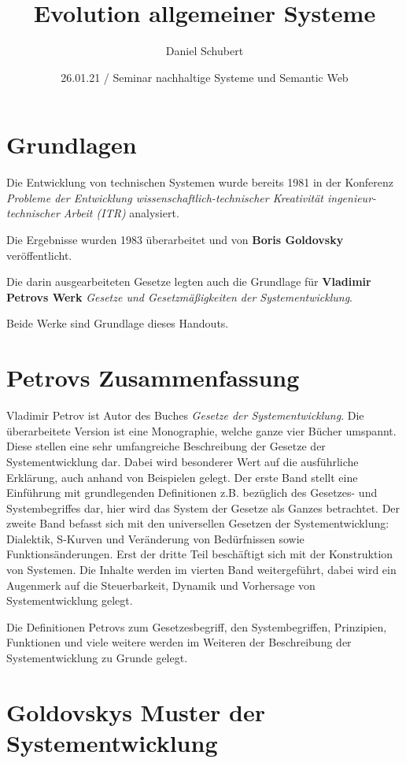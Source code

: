 \documentclass[a4paper,11pt]{article}
\title{Evolution allgemeiner Systeme}
\author{Daniel Schubert}
\date{26.01.21 / Seminar nachhaltige Systeme und Semantic Web}
\begin{document}
\maketitle

\section{Grundlagen}
Die Entwicklung von technischen Systemen wurde bereits 1981 in der Konferenz
\emph{Probleme der Entwicklung wissenschaftlich-technischer Kreativität
  ingenieur-technischer Arbeit (ITR)} analysiert.

Die Ergebnisse wurden 1983 überarbeitet und von \textbf{Boris Goldovsky}
veröffentlicht. 

Die darin ausgearbeiteten Gesetze legten auch die Grundlage für
\textbf{Vladimir Petrovs Werk} \emph{Gesetze und Gesetzmäßigkeiten der
  Systementwicklung}.

Beide Werke sind Grundlage dieses Handouts.

\section{Petrovs Zusammenfassung}

Vladimir Petrov ist Autor des Buches \cite{Petrov2020} \emph{Gesetze der
  Systementwicklung}. Die überarbeitete Version ist eine Monographie, welche
ganze vier Bücher umspannt. Diese stellen eine sehr umfangreiche Beschreibung
der Gesetze der Systementwicklung dar. Dabei wird besonderer Wert auf die
ausführliche Erklärung, auch anhand von Beispielen gelegt. Der erste Band
stellt eine Einführung mit grundlegenden Definitionen z.B. bezüglich des
Gesetzes- und Systembegriffes dar, hier wird das System der Gesetze als Ganzes
betrachtet. Der zweite Band befasst sich mit den universellen Gesetzen der
Systementwicklung: Dialektik, S-Kurven und Veränderung von Bedürfnissen sowie
Funktionsänderungen. Erst der dritte Teil beschäftigt sich mit der
Konstruktion von Systemen. Die Inhalte werden im vierten Band weitergeführt,
dabei wird ein Augenmerk auf die Steuerbarkeit, Dynamik und Vorhersage von
Systementwicklung gelegt.

Die Definitionen Petrovs zum Gesetzesbegriff, den Systembegriffen, Prinzipien,
Funktionen und viele weitere werden im Weiteren der Beschreibung der
Systementwicklung zu Grunde gelegt.

\section{Goldovskys Muster der Systementwicklung}
\end{document}
